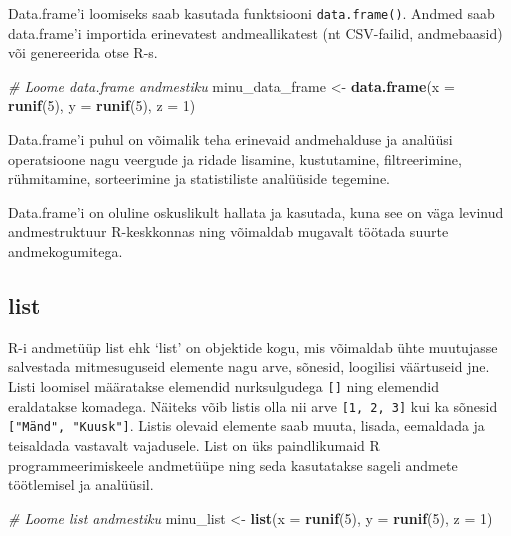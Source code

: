 \documentclass[
]{book}
\newenvironment{Shaded}{\begin{snugshade}}{\end{snugshade}}
\newcommand{\AttributeTok}[1]{\textcolor[rgb]{0.13,0.29,0.53}{#1}}
\newcommand{\CommentTok}[1]{\textcolor[rgb]{0.56,0.35,0.01}{\textit{#1}}}
\newcommand{\DecValTok}[1]{\textcolor[rgb]{0.00,0.00,0.81}{#1}}
\newcommand{\FunctionTok}[1]{\textcolor[rgb]{0.13,0.29,0.53}{\textbf{#1}}}
\newcommand{\NormalTok}[1]{#1}
\newcommand{\OtherTok}[1]{\textcolor[rgb]{0.56,0.35,0.01}{#1}}
\renewenvironment{Shaded} {\begin{snugshade}\footnotesize} {\end{snugshade}}
\begin{document}
Data.frame'i loomiseks saab kasutada funktsiooni \texttt{data.frame()}. Andmed saab data.frame'i importida erinevatest andmeallikatest (nt CSV-failid, andmebaasid) või genereerida otse R-s.

\begin{Shaded}
\begin{Highlighting}[]
\CommentTok{\# Loome data.frame andmestiku}
\NormalTok{minu\_data\_frame }\OtherTok{\textless{}{-}} \FunctionTok{data.frame}\NormalTok{(}\AttributeTok{x =} \FunctionTok{runif}\NormalTok{(}\DecValTok{5}\NormalTok{), }\AttributeTok{y =} \FunctionTok{runif}\NormalTok{(}\DecValTok{5}\NormalTok{), }\AttributeTok{z =} \DecValTok{1}\NormalTok{)}
\end{Highlighting}
\end{Shaded}

Data.frame'i puhul on võimalik teha erinevaid andmehalduse ja analüüsi operatsioone nagu veergude ja ridade lisamine, kustutamine, filtreerimine, rühmitamine, sorteerimine ja statistiliste analüüside tegemine.

Data.frame'i on oluline oskuslikult hallata ja kasutada, kuna see on väga levinud andmestruktuur R-keskkonnas ning võimaldab mugavalt töötada suurte andmekogumitega.

\subsection{list}\label{list}

R-i andmetüüp list ehk `list' on objektide kogu, mis võimaldab ühte muutujasse salvestada mitmesuguseid elemente nagu arve, sõnesid, loogilisi väärtuseid jne. Listi loomisel määratakse elemendid nurksulgudega \texttt{{[}{]}} ning elemendid eraldatakse komadega. Näiteks võib listis olla nii arve \texttt{{[}1,\ 2,\ 3{]}} kui ka sõnesid \texttt{{[}"Mänd",\ "Kuusk"{]}}. Listis olevaid elemente saab muuta, lisada, eemaldada ja teisaldada vastavalt vajadusele. List on üks paindlikumaid R programmeerimiskeele andmetüüpe ning seda kasutatakse sageli andmete töötlemisel ja analüüsil.

\begin{Shaded}
\begin{Highlighting}[]
\CommentTok{\# Loome list andmestiku}
\NormalTok{minu\_list }\OtherTok{\textless{}{-}} \FunctionTok{list}\NormalTok{(}\AttributeTok{x =} \FunctionTok{runif}\NormalTok{(}\DecValTok{5}\NormalTok{), }\AttributeTok{y =} \FunctionTok{runif}\NormalTok{(}\DecValTok{5}\NormalTok{), }\AttributeTok{z =} \DecValTok{1}\NormalTok{)}
\end{Highlighting}
\end{Shaded}
\end{document}
